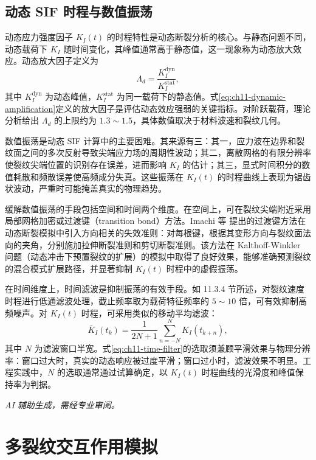 \subsection{动态 SIF 时程与数值振荡}\label{sec:ch11-dynamic-sif-time}

动态应力强度因子 $K_I(t)$ 的时程特性是动态断裂分析的核心。与静态问题不同，动态载荷下 $K_I$ 随时间变化，其峰值通常高于静态值，这一现象称为动态放大效应。动态放大因子定义为
\begin{equation}
\Lambda_d=\frac{K_I^{\mathrm{dyn}}}{K_I^{\mathrm{stat}}},
\label{eq:ch11-dynamic-amplification}
\end{equation}
其中 $K_I^{\mathrm{dyn}}$ 为动态峰值，$K_I^{\mathrm{stat}}$ 为同一载荷下的静态值。式\eqref{eq:ch11-dynamic-amplification}定义的放大因子是评估动态效应强弱的关键指标。对阶跃载荷，理论分析给出 $\Lambda_d$ 的上限约为 $1.3\sim 1.5$，具体数值取决于材料波速和裂纹几何。

数值振荡是动态 SIF 计算中的主要困难。其来源有三：其一，应力波在边界和裂纹面之间的多次反射导致尖端应力场的周期性波动；其二，离散网格的有限分辨率使裂纹尖端位置的识别存在误差，进而影响 $K_I$ 的估计；其三，显式时间积分的数值耗散和频散误差使高频成分失真。这些振荡在 $K_I(t)$ 的时程曲线上表现为锯齿状波动，严重时可能掩盖真实的物理趋势。

缓解数值振荡的手段包括空间和时间两个维度。在空间上，可在裂纹尖端附近采用局部网格加密或过渡键（transition bond）方法。Imachi 等 \cite{Imachi2019} 提出的过渡键方法在动态断裂模拟中引入方向相关的失效准则：对每根键，根据其变形方向与裂纹面法向的夹角，分别施加拉伸断裂准则和剪切断裂准则。该方法在 Kalthoff-Winkler 问题（动态冲击下预置裂纹的扩展）的模拟中取得了良好效果，能够准确预测裂纹的混合模式扩展路径，并显著抑制 $K_I(t)$ 时程中的虚假振荡。

在时间维度上，时间滤波是抑制振荡的有效手段。如 11.3.4 节所述，对裂纹速度时程进行低通滤波处理，截止频率取为载荷特征频率的 $5\sim 10$ 倍，可有效抑制高频噪声。对 $K_I(t)$ 时程，可采用类似的移动平均滤波：
\begin{equation}
\bar{K}_I(t_k)=\frac{1}{2N+1}\sum_{n=-N}^{N}K_I(t_{k+n}),
\label{eq:ch11-time-filter}
\end{equation}
其中 $N$ 为滤波窗口半宽。式\eqref{eq:ch11-time-filter}的选取须兼顾平滑效果与物理分辨率：窗口过大时，真实的动态响应被过度平滑；窗口过小时，滤波效果不明显。工程实践中，$N$ 的选取通常通过试算确定，以 $K_I(t)$ 时程曲线的光滑度和峰值保持率为判据。

\emph{AI 辅助生成，需经专业审阅。}

\section{多裂纹交互作用模拟}\label{sec:ch11-multi-crack}

